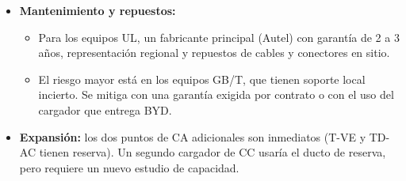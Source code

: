 \begin{itemize}
\item \textbf{Mantenimiento y repuestos:}
  \begin{itemize}
  \item Para los equipos UL, un fabricante principal (Autel) con garantía de 2 a 3 años, representación regional y repuestos de cables y conectores en sitio.
  \item El riesgo mayor está en los equipos GB/T, que tienen soporte local incierto. Se mitiga con una garantía exigida por contrato o con el uso del cargador que entrega BYD.
  \end{itemize}
\item \textbf{Expansión:} los dos puntos de CA adicionales son inmediatos (T-VE y TD-AC tienen reserva). Un segundo cargador de CC usaría el ducto de reserva, pero requiere un nuevo estudio de capacidad.
\end{itemize}

